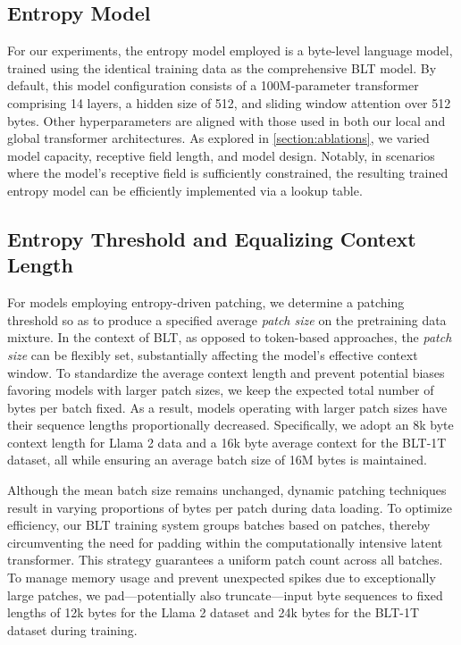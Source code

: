 \subsection{Entropy Model} For our experiments, the entropy model employed is a byte-level language model, trained using the identical training data as the comprehensive {\textsc BLT} model. By default, this model configuration consists of a 100M-parameter transformer comprising 14 layers, a hidden size of 512, and sliding window attention over 512 bytes. Other hyperparameters are aligned with those used in both our local and global transformer architectures. As explored in \autoref{section:ablations}, we varied model capacity, receptive field length, and model design. Notably, in scenarios where the model's receptive field is sufficiently constrained, the resulting trained entropy model can be efficiently implemented via a lookup table.

\subsection{Entropy Threshold and Equalizing Context Length} For models employing entropy-driven patching, we determine a patching threshold so as to produce a specified average \textit{patch size} on the pretraining data mixture. In the context of {\textsc BLT}, as opposed to token-based approaches, the \textit{patch size} can be flexibly set, substantially affecting the model’s effective context window. To standardize the average context length and prevent potential biases favoring models with larger patch sizes, we keep the expected total number of bytes per batch fixed. As a result, models operating with larger patch sizes have their sequence lengths proportionally decreased. Specifically, we adopt an 8k byte context length for Llama 2 data and a 16k byte average context for the {\textsc BLT}-1T dataset, all while ensuring an average batch size of 16M bytes is maintained.

Although the mean batch size remains unchanged, dynamic patching techniques result in varying proportions of bytes per patch during data loading. To optimize efficiency, our {\textsc BLT} training system groups batches based on patches, thereby circumventing the need for padding within the computationally intensive latent transformer. This strategy guarantees a uniform patch count across all batches. To manage memory usage and prevent unexpected spikes due to exceptionally large patches, we pad—potentially also truncate—input byte sequences to fixed lengths of 12k bytes for the Llama 2 dataset and 24k bytes for the {\textsc BLT}-1T dataset during training.

